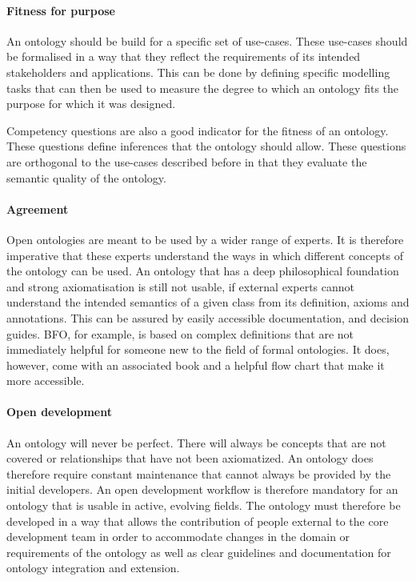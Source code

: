 \paragraph{Fitness for purpose}

An ontology should be build for a specific set of use-cases. These use-cases should be formalised in a way that they reflect the requirements of its intended stakeholders and applications. This can be done by defining specific modelling tasks that can then be used to measure the degree to which an ontology fits the purpose for which it was designed.

Competency questions are also a good indicator for the fitness of an ontology. These questions define inferences that the ontology should allow. These questions are orthogonal to the use-cases described before in that they evaluate the semantic quality of the ontology.

\paragraph{Agreement}

Open ontologies are meant to be used by a wider range of experts. It is therefore imperative that these experts understand the ways in which different concepts of the ontology can be used. An ontology that has a deep philosophical foundation and strong axiomatisation is still not usable, if external experts cannot understand the intended semantics of a given class from its definition, axioms and annotations. This can be assured by easily accessible documentation, and decision guides. BFO, for example, is based on complex definitions that are not immediately helpful for someone new to the field of formal ontologies. It does, however, come with an associated book and a helpful flow chart \cite{bernabe2023method} that make it more accessible.

\paragraph{Open development}

An ontology will never be perfect. There will always be concepts that are not covered or relationships that have not been axiomatized. An ontology does therefore require constant maintenance that cannot always be provided by the initial developers. An open development workflow is therefore mandatory for an ontology that is usable in active, evolving fields. The ontology must therefore be developed in a way that allows the contribution of people external to the core development team in order to accommodate changes in the domain or requirements of the ontology as well as clear guidelines and documentation for ontology integration and extension. %

